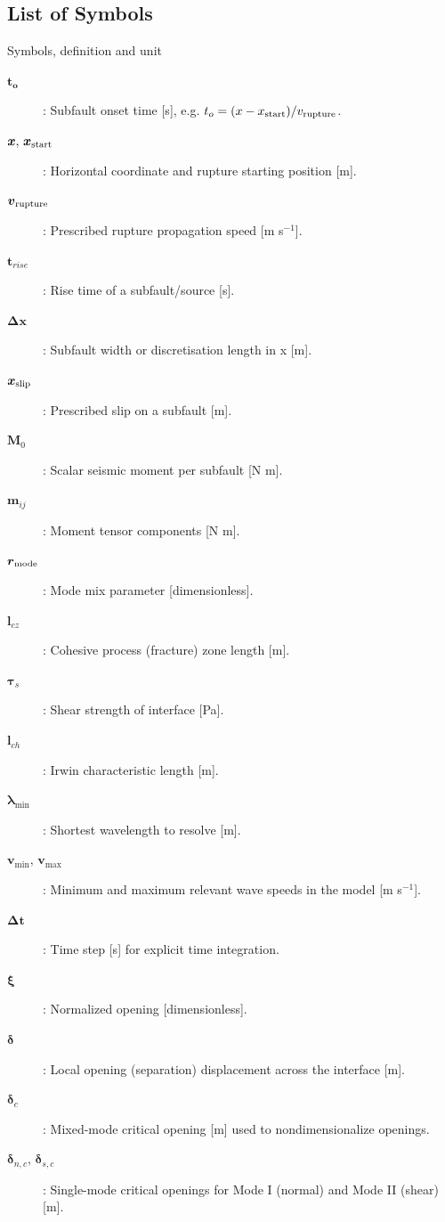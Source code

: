 \documentclass[10pt]{article}
\begin{document}
\subsection{List of Symbols}
Symbols, definition and unit 
\begin{description}
  \item[$\boldsymbol{t_o}$]: Subfault onset time [s], e.g. $t_o=(x-x_{\rm start})/v_{\rm rupture}$.
  \item[$\boldsymbol{x},\,\boldsymbol{x}_{\rm start}$]: Horizontal coordinate and rupture starting position [m].
  \item[$\boldsymbol{v}_{\rm rupture}$]: Prescribed rupture propagation speed [m s$^{-1}$].
  \item[$\boldsymbol{t}_{rise}$]: Rise time of a subfault/source [s].
  \item[$\boldsymbol{\Delta x}$]: Subfault width or discretisation length in x [m].
  \item[$\boldsymbol{x}_{\rm slip}$]: Prescribed slip on a subfault [m].
  \item[$\boldsymbol{M}_0$]: Scalar seismic moment per subfault [N m].
  \item[$\boldsymbol{m}_{ij}$]: Moment tensor components [N m]. 
  \item[$\boldsymbol{r}_{\rm mode}$]: Mode mix parameter [dimensionless].
  \item[$\boldsymbol{l}_{cz}$]: Cohesive process (fracture) zone length [m].
  \item[$\boldsymbol\tau_s$]: Shear strength of interface [Pa].
  \item[$\boldsymbol{l}_{ch}$]: Irwin characteristic length [m].
  \item[$\boldsymbol{\lambda}_{\min}$]: Shortest wavelength to resolve [m].
  \item[$\boldsymbol{v}_{\min},\,\boldsymbol{v}_{\max}$]: Minimum and maximum relevant wave speeds in the model [m s$^{-1}$].
  \item[$\boldsymbol{\Delta t}$]: Time step [s] for explicit time integration.
  \item[$\boldsymbol{\xi}$]: Normalized opening [dimensionless].
  \item[$\boldsymbol{\delta}$]: Local opening (separation) displacement across the interface [m].
  \item[$\boldsymbol{\delta}_c$]: Mixed-mode critical opening [m] used to nondimensionalize openings.
  \item[$\boldsymbol{\delta}_{n,c},\,\boldsymbol{\delta}_{s,c}$]: Single-mode critical openings for Mode I (normal) and Mode II (shear) [m].

\end{description}
\end{document}
